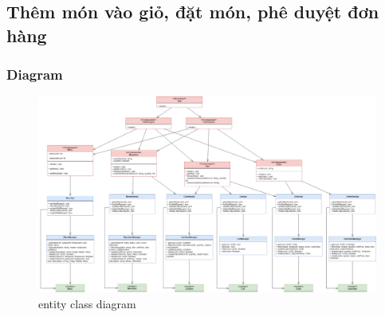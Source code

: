\newpage
\subsection{Thêm món vào giỏ, đặt món, phê duyệt đơn hàng}
\subsubsection{Diagram}
\begin{figure}[!h]
    \begin{center}
        \includegraphics[scale=0.25,angle=90]{Images/ClassDiagram/order.png}
    \end{center}
    \hspace{0.3cm}
    \caption{entity class diagram}
\end{figure}
\newpage
